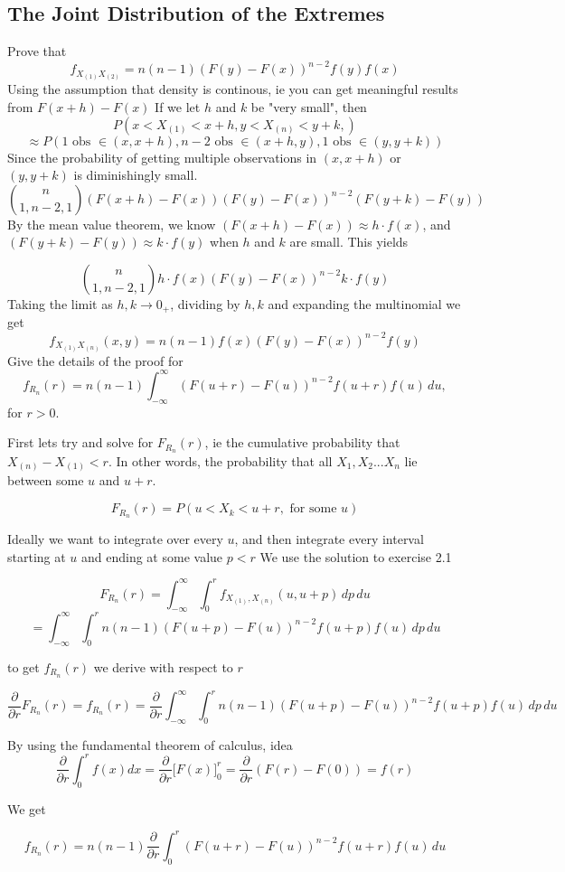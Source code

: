 \subsection{The Joint Distribution of the Extremes}

\exercise Prove that 
\[
  f_{X_{(1)}X_{(2)}} = n(n-1) (F(y)-F(x))^{n-2}f(y)f(x)  
\]
Using the assumption that density is continous, ie you can get meaningful results from $F(x+h)-F(x)$
\solution
If we let $h$ and $k$ be "very small", then
\[
  P(x < X_{(1)} < x+h,y < X_{(n)} <y+k, )  
\]\[
  \approx P(1 \text{ obs } \in (x, x+h), n-2 \text{ obs } \in (x+h, y), 1 \text{ obs } \in (y, y+k) )
\]
Since the probability of getting multiple observations in $(x, x+h)$ or $(y, y+k)$ is diminishingly small.
\[
    \genfrac{(}{)}{0pt}{}{n}{1,n-2,1} (F(x+h)-F(x)) (F(y)-F(x))^{n-2} (F(y+k)-F(y))
\]
By the mean value theorem, we know $(F(x+h)-F(x)) \approx h \cdot f(x) $, and $(F(y+k)-F(y)) \approx k \cdot f(y) $ when $h$ and $k$ are small.
This yields 

\[
    \genfrac{(}{)}{0pt}{}{n}{1,n-2,1} h\cdot f(x) (F(y)-F(x))^{n-2} k \cdot f(y)
\]
Taking the limit as $h, k \rightarrow 0_+$, dividing by $h,k$ and expanding the multinomial we get 
\[
    f_{X_{(1)}X_{(n)}}(x, y) = n(n-1) f(x)  (F(y)-F(x))^{n-2}f(y)  
\]
\exercise
Give the details of the proof for
\[
f_{R_n}(r) = n(n - 1) \int_{-\infty}^{\infty} (F(u + r) - F(u))^{n-2} f(u + r) f(u) \, du,
\]
for $r > 0$.


\solution
First lets try and solve for $F_{R_n}(r)$, ie the cumulative probability that $X_{(n)} - X_{(1)} < r$. In other words, 
the probability that all $X_1, X_2 ... X_n$ lie between some $u$ and $u+r$.

\[
    F_{R_n}(r) = P(u < X_k < u+r, \text{ for some } u)
\]

Ideally we want to integrate over every $u$, and then integrate every interval starting at $u$ and ending at some value $p < r$
We use the solution to exercise 2.1


 \[
    F_{R_n}(r) = \int_{-\infty}^{\infty} \int_{0}^{r} f_{X_{(1)}, X_{(n)}}(u, u+p)  \, dp \, du
\]
\[
    = \int_{-\infty}^{\infty} \int_{0}^{r} n(n-1)  (F(u+p)-F(u))^{n-2}f(u+p) f(u)    \, dp \, du
\]

to get $f_{R_n}(r)$ we derive with respect to $r$

\[
    \frac{\partial}{\partial r} F_{R_n}(r) =  f_{R_n}(r) =\frac{\partial}{\partial r}  \int_{-\infty}^{\infty} \int_{0}^{r} n(n-1)  (F(u+p)-F(u))^{n-2}f(u+p) f(u)    \, dp \, du
\]

By using the fundamental theorem of calculus, idea
\[
    \frac{\partial}{\partial r} \int_{0}^{r} f(x) dx = \frac{\partial}{\partial r} \biggl[F(x)\biggr]_{0}^{r} =
    \frac{\partial}{\partial r} (F(r) - F(0)) = f(r)
\]

We get 


\[
 f_{R_n}(r) =n(n-1) \frac{\partial}{\partial r} \int_{0}^{r}   (F(u+r)-F(u))^{n-2}f(u+r) f(u)  \, du
\]



